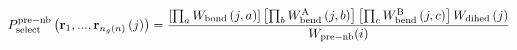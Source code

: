 \documentclass[12pt]{article}
\begin{document}
\begin{displaymath}
P_{\rm select}^{\rm pre-nb}\left({\bf r}_{1},...,{\bf r}_{n_g(n)}\left(j\right)\right) = 
{
{
\left[\prod_{a} W_{\rm bond}\left(j,a\right)\right]
\left[\prod_{b} W_{\rm bend}^{\rm A}\left(j,b\right)\right]
\left[\prod_{c} W_{\rm bend}^{\rm B}\left(j,c\right)\right]
W_{\rm dihed}\left(j\right)
}
\over
{
W_{\rm pre-nb}(i)
}
}
\end{displaymath}
\end{document}
